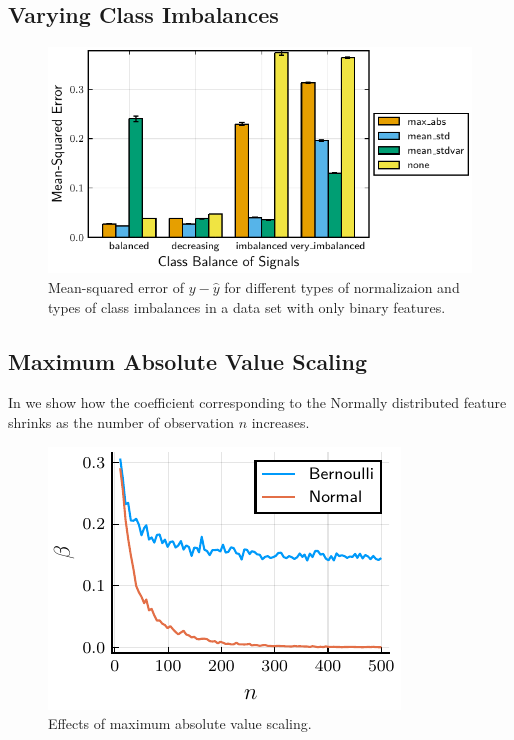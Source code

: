 \subsection{Varying Class Imbalances}

\begin{figure}[htpb]
  \centering
  \includegraphics[]{plots/binary_data_sim.pdf}
  \caption{%
    Mean-squared error of \(y - \hat y\) for different types of normalizaion and types of class imbalances in a data set with only binary features.
  }
  \label{fig:}
\end{figure}


\subsection{Maximum Absolute Value Scaling}

In  we show how the coefficient corresponding to the Normally distributed feature shrinks as the number of observation \(n\) increases.

\begin{figure}[htpb]
  \centering
  \includegraphics[]{plots/maxabs_n.pdf}
  \caption{%
    Effects of maximum absolute value scaling.
  }
  \label{fig:maxabs-n}
\end{figure}


\printbibliography



